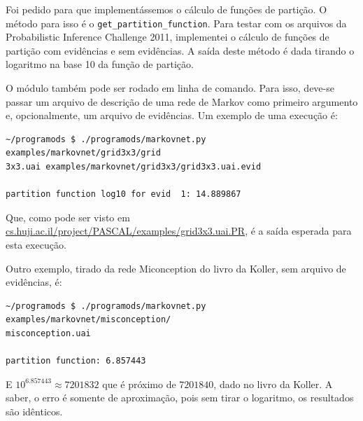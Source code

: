\documentclass[paper=a4, fontsize=11pt]{scrartcl} %
\numberwithin{equation}{subsection}
\numberwithin{figure}{subsection}
\numberwithin{table}{subsection}
\numberwithin{definition}{subsection}
\numberwithin{theorem}{subsection}
\numberwithin{property}{subsection}
\numberwithin{proposition}{subsection}
\numberwithin{equation}{section}
\numberwithin{figure}{section}
\numberwithin{table}{section}
\numberwithin{definition}{section}
\numberwithin{theorem}{section}
\numberwithin{property}{section}
\numberwithin{proposition}{section}
\begin{document}
Foi pedido para que implementássemos o cálculo de funções de partição. O método para isso é o \verb|get_partition_function|. Para testar com os arquivos da Probabilistic Inference Challenge 2011, implementei o cálculo de funções de partição com evidências e sem evidências. A saída deste método é dada tirando o logaritmo na base 10 da função de partição.

O módulo também pode ser rodado em linha de comando. Para isso, deve-se passar um arquivo de descrição de uma rede de Markov como primeiro argumento e, opcionalmente, um arquivo de evidências. Um exemplo de uma execução é:
\begin{verbatim}
~/programods $ ./programods/markovnet.py examples/markovnet/grid3x3/grid
3x3.uai examples/markovnet/grid3x3/grid3x3.uai.evid

partition function log10 for evid  1: 14.889867
\end{verbatim}

Que, como pode ser visto em \url{cs.huji.ac.il/project/PASCAL/examples/grid3x3.uai.PR}, é a saída esperada para esta execução.

Outro exemplo, tirado da rede Miconception do livro da Koller, sem arquivo de evidências, é:
\begin{verbatim}
~/programods $ ./programods/markovnet.py examples/markovnet/misconception/
misconception.uai

partition function: 6.857443
\end{verbatim}

E $10^{6.857443} \approx 7201832$ que é próximo de $7201840$, dado no livro da Koller. A saber, o erro é somente de aproximação, pois sem tirar o logaritmo, os resultados são idênticos.
\end{document}
